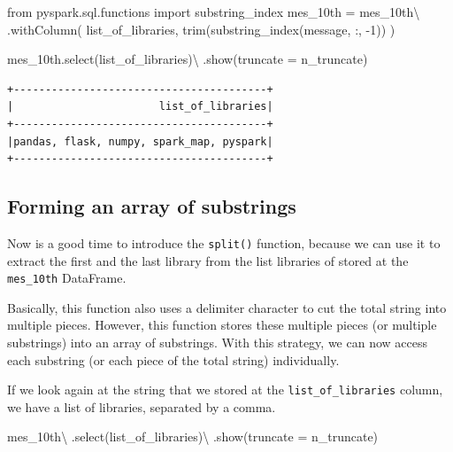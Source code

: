 \documentclass[
  11pt,
  letterpaper,
  DIV=11,
  numbers=noendperiod]{scrreprt}
\newenvironment{Shaded}{\begin{snugshade}}{\end{snugshade}}
\newcommand{\DecValTok}[1]{\textcolor[rgb]{0.68,0.00,0.00}{#1}}
\newcommand{\ImportTok}[1]{\textcolor[rgb]{0.00,0.46,0.62}{#1}}
\newcommand{\NormalTok}[1]{\textcolor[rgb]{0.00,0.23,0.31}{#1}}
\newcommand{\OperatorTok}[1]{\textcolor[rgb]{0.37,0.37,0.37}{#1}}
\newcommand{\StringTok}[1]{\textcolor[rgb]{0.13,0.47,0.30}{#1}}
\begin{document}
\begin{Shaded}
\begin{Highlighting}[]
\ImportTok{from}\NormalTok{ pyspark.sql.functions }\ImportTok{import}\NormalTok{ substring\_index}
\NormalTok{mes\_10th }\OperatorTok{=}\NormalTok{ mes\_10th}\OperatorTok{\textbackslash{}}
\NormalTok{    .withColumn(}
        \StringTok{\textquotesingle{}list\_of\_libraries\textquotesingle{}}\NormalTok{,}
\NormalTok{        trim(substring\_index(}\StringTok{\textquotesingle{}message\textquotesingle{}}\NormalTok{, }\StringTok{\textquotesingle{}:\textquotesingle{}}\NormalTok{, }\OperatorTok{{-}}\DecValTok{1}\NormalTok{))}
\NormalTok{    )}

\NormalTok{mes\_10th.select(}\StringTok{\textquotesingle{}list\_of\_libraries\textquotesingle{}}\NormalTok{)}\OperatorTok{\textbackslash{}}
\NormalTok{    .show(truncate }\OperatorTok{=}\NormalTok{ n\_truncate)}
\end{Highlighting}
\end{Shaded}

\begin{verbatim}
+----------------------------------------+
|                       list_of_libraries|
+----------------------------------------+
|pandas, flask, numpy, spark_map, pyspark|
+----------------------------------------+
\end{verbatim}

\hypertarget{forming-an-array-of-substrings}{%
\subsection{Forming an array of
substrings}\label{forming-an-array-of-substrings}}

Now is a good time to introduce the \texttt{split()} function, because
we can use it to extract the first and the last library from the list
libraries of stored at the \texttt{mes\_10th} DataFrame.

Basically, this function also uses a delimiter character to cut the
total string into multiple pieces. However, this function stores these
multiple pieces (or multiple substrings) into an array of substrings.
With this strategy, we can now access each substring (or each piece of
the total string) individually.

If we look again at the string that we stored at the
\texttt{list\_of\_libraries} column, we have a list of libraries,
separated by a comma.

\begin{Shaded}
\begin{Highlighting}[]
\NormalTok{mes\_10th}\OperatorTok{\textbackslash{}}
\NormalTok{    .select(}\StringTok{\textquotesingle{}list\_of\_libraries\textquotesingle{}}\NormalTok{)}\OperatorTok{\textbackslash{}}
\NormalTok{    .show(truncate }\OperatorTok{=}\NormalTok{ n\_truncate)}
\end{Highlighting}
\end{Shaded}
\end{document}
